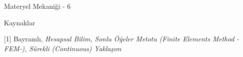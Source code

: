 \documentclass[12pt,fleqn]{article}\usepackage{../../common}
\begin{document}
Materyel Mekaniği - 6








Kaynaklar

[1] Bayramlı, {\em Hesapsal Bilim, Sonlu Öğeler Metotu (Finite Elements Method -FEM-), Sürekli (Continuous) Yaklaşım}
\end{document}
